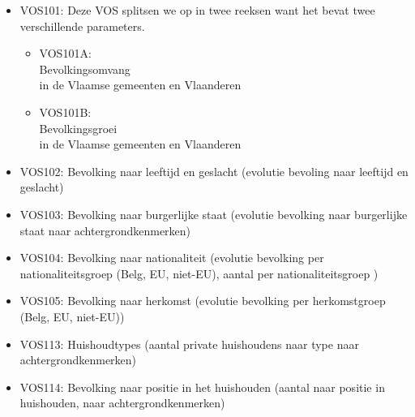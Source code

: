 \documentclass{SVnote}
\begin{document}
\begin{itemize}
\item VOS101: Deze VOS splitsen we op in twee reeksen want het bevat twee verschillende parameters.
	\begin{itemize}
	\item VOS101A: \\Bevolkingsomvang \\in de Vlaamse gemeenten en Vlaanderen
	\item VOS101B: \\Bevolkingsgroei \\in de Vlaamse gemeenten en Vlaanderen
	\end{itemize}


\item VOS102: Bevolking naar leeftijd en geslacht (evolutie bevoling naar leeftijd en geslacht)
\item VOS103: Bevolking naar burgerlijke staat (evolutie bevolking naar burgerlijke staat naar achtergrondkenmerken)
\item VOS104: Bevolking naar nationaliteit (evolutie bevolking per nationaliteitsgroep (Belg, EU, niet-EU), aantal per nationaliteitsgroep )
\item VOS105: Bevolking naar herkomst (evolutie bevolking per herkomstgroep (Belg, EU, niet-EU))
\item VOS113: Huishoudtypes	(aantal private huishoudens naar type naar achtergrondkenmerken)
\item VOS114:  Bevolking naar positie in het huishouden (aantal naar positie in huishouden, naar achtergrondkenmerken)



\end{itemize}
\end{document}
